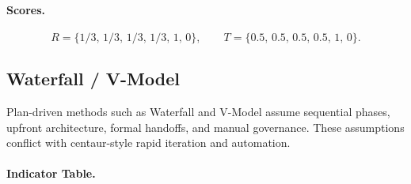 \documentclass[11pt, a4paper, twocolumn]{article} %
\begin{document}
\paragraph{Scores.}

\[
R = \{1/3,\,1/3,\,1/3,\,1/3,\,1,\,0\},\qquad
T = \{0.5,\,0.5,\,0.5,\,0.5,\,1,\,0\}.
\]

\newpage
\subsection*{Waterfall / V-Model}

Plan-driven methods such as Waterfall and V-Model \citep{royce1970waterfall}
assume sequential phases, upfront architecture, formal handoffs, and manual
governance. These assumptions conflict with centaur-style rapid iteration and
automation.

\paragraph{Indicator Table.}
\end{document}
